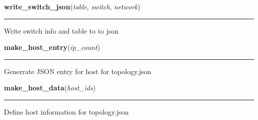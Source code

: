     \label{initialize_system:Write_Jsons:write_switch_json}

    \vspace{0.5ex}

\hspace{.8\funcindent}\begin{boxedminipage}{\funcwidth}

    \raggedright \textbf{write\_switch\_json}(\textit{table}, \textit{switch}, \textit{network})

    \vspace{-1.5ex}

    \rule{\textwidth}{0.5\fboxrule}
\setlength{\parskip}{2ex}
    Write switch info and table to to json

\setlength{\parskip}{1ex}
    \end{boxedminipage}

    \label{initialize_system:Write_Jsons:make_host_entry}

    \vspace{0.5ex}

\hspace{.8\funcindent}\begin{boxedminipage}{\funcwidth}

    \raggedright \textbf{make\_host\_entry}(\textit{ip\_count})

    \vspace{-1.5ex}

    \rule{\textwidth}{0.5\fboxrule}
\setlength{\parskip}{2ex}
    Generrate JSON entry for host for topology.json

\setlength{\parskip}{1ex}
    \end{boxedminipage}

    \label{initialize_system:Write_Jsons:make_host_data}

    \vspace{0.5ex}

\hspace{.8\funcindent}\begin{boxedminipage}{\funcwidth}

    \raggedright \textbf{make\_host\_data}(\textit{host\_ids})

    \vspace{-1.5ex}

    \rule{\textwidth}{0.5\fboxrule}
\setlength{\parskip}{2ex}
    Define host information for topology.json

\setlength{\parskip}{1ex}
    \end{boxedminipage}

